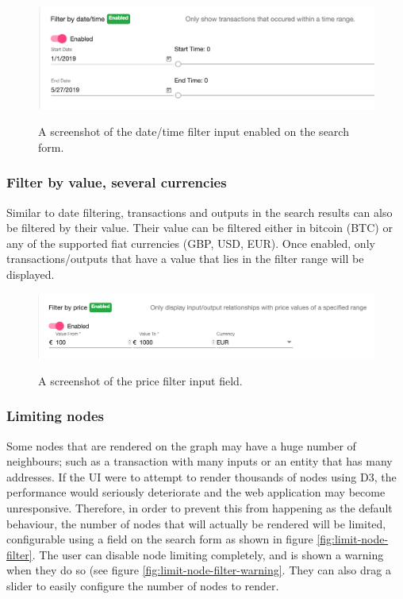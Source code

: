 \begin{figure}[h!]
  \centering
  \includegraphics[width = 15cm]{./figures/ui-screenshots/date-time-filter}\\[0.5cm] 
  \caption{A screenshot of the date/time filter input enabled on the search form.}
  \label{fig:date-time-filter}
\end{figure}

\subsubsection{Filter by value, several currencies}
Similar to date filtering, transactions and outputs in the search results can also be filtered by their value. Their value can be filtered either in bitcoin (BTC) or any of the supported fiat currencies (GBP, USD, EUR). Once enabled, only transactions/outputs that have a value that lies in the filter range will be displayed. 

\begin{figure}[h!]
  \centering
  \includegraphics[width = 15cm]{./figures/ui-screenshots/price-filter-form}\\[0.5cm] 
  \caption{A screenshot of the price filter input field.}
  \label{fig:date-time-filter}
\end{figure}

\subsubsection{Limiting nodes}\label{feature-limit-nodes}
Some nodes that are rendered on the graph may have a huge number of neighbours; such as a transaction with many inputs or an entity that has many addresses. If the UI were to attempt to render thousands of nodes using D3, the performance would seriously deteriorate and the web application may become unresponsive. Therefore, in order to prevent this from happening as the default behaviour, the number of nodes that will actually be rendered will be limited, configurable using a field on the search form as shown in figure \ref{fig:limit-node-filter}. The user can disable node limiting completely, and is shown a warning when they do so (see  figure \ref{fig:limit-node-filter-warning}. They can also drag a slider to easily configure the number of nodes to render. 

